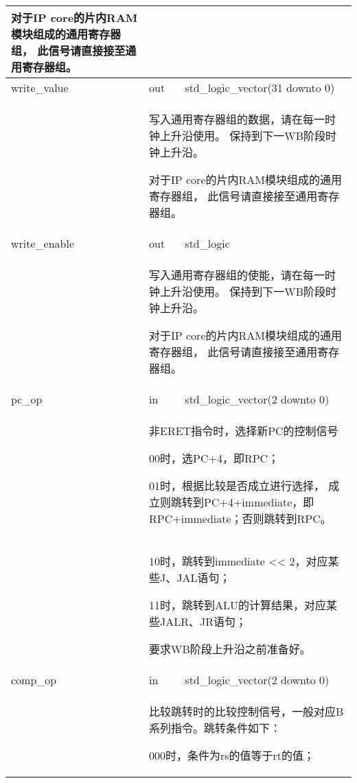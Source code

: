 \begin{tabularx}{\textwidth}{lll}
{                对于IP core的片内RAM模块组成的通用寄存器组，%
                此信号请直接接至通用寄存器组。
            } \\
            \midrule
            write\_value    & out   & std\_logic\_vector(31 downto 0) \\
            \cmidrule(l){2-3}
            &
            \multicolumn{2}{X}{
                写入通用寄存器组的数据，请在每一时钟上升沿使用。%
                保持到下一WB阶段时钟上升沿。

                对于IP core的片内RAM模块组成的通用寄存器组，%
                此信号请直接接至通用寄存器组。
            } \\
            \midrule
            write\_enable   & out   & std\_logic \\
            \cmidrule(l){2-3}
            &
            \multicolumn{2}{X}{
                写入通用寄存器组的使能，请在每一时钟上升沿使用。%
                保持到下一WB阶段时钟上升沿。

                对于IP core的片内RAM模块组成的通用寄存器组，%
                此信号请直接接至通用寄存器组。
            } \\
            \midrule
	        pc\_op          & in    & std\_logic\_vector(2 downto 0) \\
            \cmidrule(l){2-3}
            &
            \multicolumn{2}{X}{
                非ERET指令时，选择新PC的控制信号                                             

                    00时，选PC+4，即RPC；                                                    

                    01时，根据比较是否成立进行选择，%
                    成立则跳转到PC+4+immediate，即RPC+immediate；否则跳转到RPC。
            } \\
            &
            \multicolumn{2}{X}{
                    10时，跳转到immediate << 2，对应某些J、JAL语句；

                    11时，跳转到ALU的计算结果，对应某些JALR、JR语句；

                要求WB阶段上升沿之前准备好。
            } \\
            \midrule
            comp\_op        & in    & std\_logic\_vector(2 downto 0) \\
            \cmidrule(l){2-3}
            &
            \multicolumn{2}{X}{
                比较跳转时的比较控制信号，一般对应B系列指令。跳转条件如下：

                    000时，条件为rs的值等于rt的值；

}
\end{tabularx}
